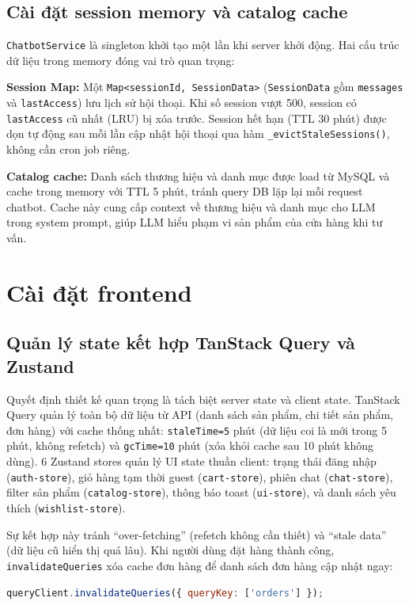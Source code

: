 \subsection{Cài đặt session memory và catalog cache}

\texttt{ChatbotService} là singleton khởi tạo một lần khi server khởi động. Hai cấu trúc dữ liệu trong memory đóng vai trò quan trọng:

\textbf{Session Map:} Một \texttt{Map<sessionId, SessionData>} (\texttt{SessionData} gồm \texttt{messages} và \texttt{lastAccess}) lưu lịch sử hội thoại. Khi số session vượt 500, session có \texttt{lastAccess} cũ nhất (LRU) bị xóa trước. Session hết hạn (TTL 30 phút) được dọn tự động sau mỗi lần cập nhật hội thoại qua hàm \texttt{\_evictStaleSessions()}, không cần cron job riêng.

\textbf{Catalog cache:} Danh sách thương hiệu và danh mục được load từ MySQL và cache trong memory với TTL 5 phút, tránh query DB lặp lại mỗi request chatbot. Cache này cung cấp context về thương hiệu và danh mục cho LLM trong system prompt, giúp LLM hiểu phạm vi sản phẩm của cửa hàng khi tư vấn.

\section{Cài đặt frontend}
\label{sec:c4_frontend_impl}

\subsection{Quản lý state kết hợp TanStack Query và Zustand}

Quyết định thiết kế quan trọng là tách biệt server state và client state. TanStack Query quản lý toàn bộ dữ liệu từ API (danh sách sản phẩm, chi tiết sản phẩm, đơn hàng) với cache thống nhất: \texttt{staleTime=5} phút (dữ liệu coi là mới trong 5 phút, không refetch) và \texttt{gcTime=10} phút (xóa khỏi cache sau 10 phút không dùng). 6 Zustand stores quản lý UI state thuần client: trạng thái đăng nhập (\texttt{auth-store}), giỏ hàng tạm thời guest (\texttt{cart-store}), phiên chat (\texttt{chat-store}), filter sản phẩm (\texttt{catalog-store}), thông báo toast (\texttt{ui-store}), và danh sách yêu thích (\texttt{wishlist-store}).

Sự kết hợp này tránh ``over-fetching'' (refetch không cần thiết) và ``stale data'' (dữ liệu cũ hiển thị quá lâu). Khi người dùng đặt hàng thành công, \texttt{invalidateQueries} xóa cache đơn hàng để danh sách đơn hàng cập nhật ngay:
\begin{lstlisting}[language=JavaScript, numbers=none]
queryClient.invalidateQueries({ queryKey: ['orders'] });
\end{lstlisting}
